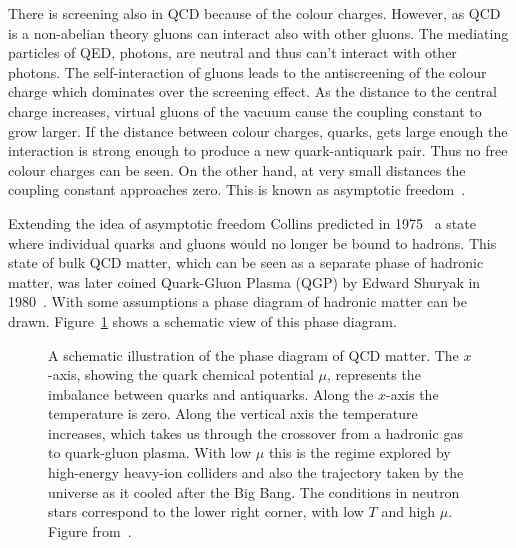 There is screening also in QCD because of the colour charges. However, as QCD is a non-abelian theory gluons can interact also with other gluons. The mediating particles of QED, photons, are neutral and thus can't interact with other photons. The self-interaction of gluons leads to the antiscreening of the colour charge which dominates over the screening effect. As the distance to the central charge increases, virtual gluons of the vacuum cause the coupling constant to grow larger. If the distance between colour charges, quarks, gets large enough the interaction is strong enough to produce a new quark-antiquark pair. Thus no free colour charges can be seen. On the other hand, at very small distances the coupling constant approaches zero. This is known as asymptotic freedom~\cite{Perkins:1982xb}.


Extending the idea of asymptotic freedom Collins predicted in 1975~\cite{Collins:1975} a state where individual quarks and gluons would no longer be bound to hadrons. This state of bulk QCD matter, which can be seen as a separate phase of hadronic matter, was later coined Quark-Gluon Plasma (QGP) by Edward Shuryak in 1980~\cite{Shuryak:1980}. With some assumptions a phase diagram of hadronic matter can be drawn. Figure~\ref{fig:QCDphase} shows a schematic view of this phase diagram.

\begin{figure}[htb]
\centering

\caption[QCD phase diagram]{A schematic illustration of the phase diagram of QCD matter. The $x$-axis, showing the quark chemical potential $\mu$, represents the imbalance between quarks and antiquarks. Along the $x$-axis the temperature is zero. Along the vertical axis the temperature increases, which takes us through the crossover from a hadronic gas to quark-gluon plasma. With low $\mu$ this is the regime explored by high-energy heavy-ion colliders and also the trajectory taken by the universe as it cooled after the Big Bang. The conditions in neutron stars correspond to the lower right corner, with low $T$ and high $\mu$. Figure from~\cite{Rajagopal:2001}.} 
\label{fig:QCDphase}
\end{figure}


